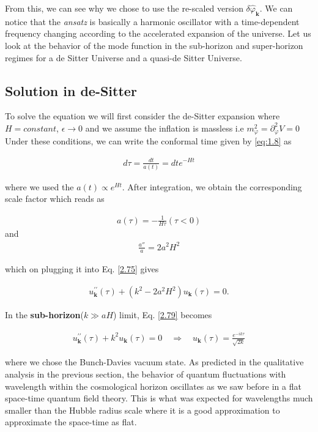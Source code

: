  From this, we can see why we chose to use the re-scaled version  $\delta \hat{\varphi}_{\mathbf{k}}$. We can notice that the \emph{ansatz} is basically a harmonic oscillator with a time-dependent frequency changing according to the accelerated expansion of the universe. Let us look at the behavior of the mode function in the sub-horizon and super-horizon regimes for a de Sitter Universe and a quasi-de Sitter Universe.

\subsection*{Solution in de-Sitter}
To solve the equation we will first consider the de-Sitter expansion where $H = constant$, $\epsilon \rightarrow 0$  and we assume the inflation is massless i.e 
\(m_{\varphi}^2 = \partial_{\varphi}^2{V} = 0\)
Under these conditions, we can write the  conformal time given by \ref{eq:1.8} as

\begin{align}
    d \tau=\frac{d t}{a(t)}=d t e^{-H t} \label{2.76}
\end{align}

where we used the $a(t) \propto e^{Ht}$. After integration, we obtain the corresponding scale factor which reads as

\begin{align}
    a(\tau) = -\frac{1}{H\tau}(\tau < 0)  \label{2.77}
\end{align}
and
\begin{align}
    \frac{a''}{a} = 2a^2H^2 \label{2.78}
\end{align}

which on plugging it into Eq. \ref{2.75} gives

\begin{align}
    u_{\mathbf{k}}^{\prime \prime}(\tau)+\left(k^{2}-2 a^{2} H^{2}\right) u_{\mathbf{k}}(\tau)=0 .\label{2.79}
\end{align}



In the \textbf{sub-horizon}($k \gg a H$) limit, Eq. \ref{2.79} becomes

\begin{align}
    u_{\mathbf{k}}^{\prime \prime}(\tau)+k^{2} u_{\mathbf{k}}(\tau)=0 \quad \Rightarrow \quad u_{\mathbf{k}}(\tau)=\frac{e^{-i k \tau}}{\sqrt{2 k}} \label{2.80}
\end{align}


where we chose the Bunch-Davies vacuum state. As predicted in the qualitative analysis in the previous section, the behavior of quantum fluctuations with wavelength within the cosmological horizon oscillates as we saw before in a flat space-time quantum field theory. This is what was expected for wavelengths much smaller than the Hubble radius scale where it is a good approximation to approximate the space-time as flat.\\

